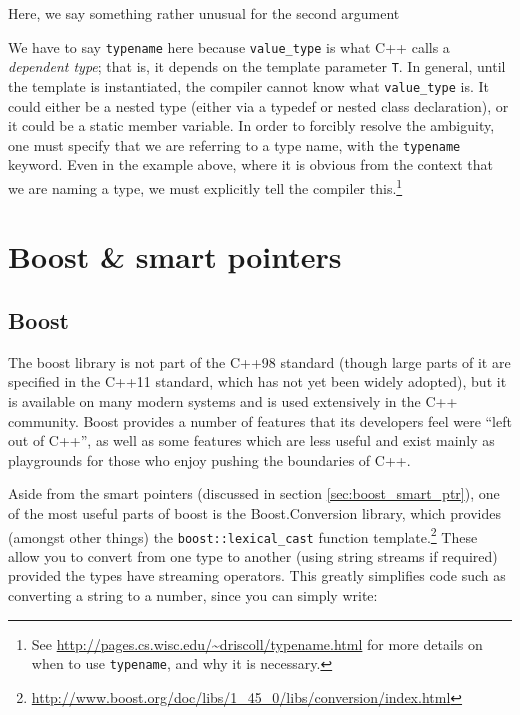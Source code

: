 \documentclass[a4paper]{scrartcl}
\begin{document}


Here, we say something rather unusual for the second argument



We have to say \verb|typename| here because \verb|value_type| is what C++ calls a \emph{dependent type}; that is, it depends on the template parameter \verb|T|. In general, until the template is instantiated, the compiler cannot know what \verb|value_type| is. It could either be a nested type (either via a typedef or nested class declaration), or it could be a static member variable. In order to forcibly resolve the ambiguity, one must specify that we are referring to a type name, with the \verb|typename| keyword. Even in the example above, where it is obvious from the context that we are naming a type, we must explicitly tell the compiler this.\footnote{See \url{http://pages.cs.wisc.edu/~driscoll/typename.html} for more details on when to use \texttt{typename}, and why it is necessary.} 

\section{Boost \& smart pointers}\label{sec:boost}
\subsection{Boost}
The boost library is not part of the C++98 standard (though large parts of it are specified in the C++11 standard, which has not yet been widely adopted), but it is available on many modern systems and is used extensively in the C++ community. Boost provides a number of features that its developers feel were ``left out of C++'', as well as some features which are less useful and exist mainly as playgrounds for those who enjoy pushing the boundaries of C++.

Aside from the smart pointers (discussed in section \ref{sec:boost_smart_ptr}), one of the most useful parts of boost is the Boost.Conversion library, which provides (amongst other things) the \verb|boost::lexical_cast| function template.\footnote{\url{http://www.boost.org/doc/libs/1_45_0/libs/conversion/index.html}} These allow you to convert from one type to another (using string streams if required) provided the types have streaming operators. This greatly simplifies code such as converting a string to a number, since you can simply write:


\end{document}
